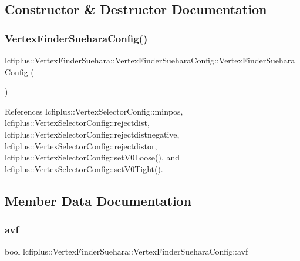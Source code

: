 \subsection{Constructor \& Destructor Documentation}
\mbox{\label{classlcfiplus_1_1VertexFinderSuehara_1_1VertexFinderSueharaConfig_ad8515a7447c5f5b8349048b7a2cf318c}} 
\subsubsection{Vertex\+Finder\+Suehara\+Config()}
{\footnotesize\ttfamily lcfiplus\+::\+Vertex\+Finder\+Suehara\+::\+Vertex\+Finder\+Suehara\+Config\+::\+Vertex\+Finder\+Suehara\+Config (\begin{DoxyParamCaption}{ }\end{DoxyParamCaption})\hspace{0.3cm}{\ttfamily [inline]}}



References lcfiplus\+::\+Vertex\+Selector\+Config\+::minpos, lcfiplus\+::\+Vertex\+Selector\+Config\+::rejectdist, lcfiplus\+::\+Vertex\+Selector\+Config\+::rejectdistnegative, lcfiplus\+::\+Vertex\+Selector\+Config\+::rejectdistor, lcfiplus\+::\+Vertex\+Selector\+Config\+::set\+V0\+Loose(), and lcfiplus\+::\+Vertex\+Selector\+Config\+::set\+V0\+Tight().



\subsection{Member Data Documentation}
\mbox{\label{classlcfiplus_1_1VertexFinderSuehara_1_1VertexFinderSueharaConfig_a4dde8d34f13425f499c72dc17f8f49c7}} 
\subsubsection{avf}
{\footnotesize\ttfamily bool lcfiplus\+::\+Vertex\+Finder\+Suehara\+::\+Vertex\+Finder\+Suehara\+Config\+::avf}



